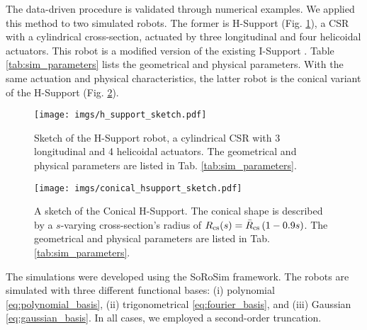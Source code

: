 The data-driven procedure is validated through numerical examples. We applied this method to two simulated robots.
The former is H-Support (Fig. \ref{fig:h_support}), a \ac{CSR} with a cylindrical cross-section, actuated by three longitudinal and four helicoidal actuators. This robot is a modified version of the existing I-Support \cite{manti2016soft}.
Table \ref{tab:sim_parameters} lists the geometrical and physical parameters.
With the same actuation and physical characteristics, the latter robot is the conical variant of the H-Support (Fig. \ref{fig:conical_hsupport_sketch}).
%     
\begin{figure}
    \centering
    \texttt{[image: imgs/h\_support\_sketch.pdf]}
    \caption{Sketch of the H-Support robot, a cylindrical \ac{CSR} with 3 longitudinal and 4 helicoidal actuators. The geometrical and physical parameters are listed in Tab. \ref{tab:sim_parameters}.}
    \label{fig:h_support}
\end{figure}
%     
\begin{figure}
    \centering
    \texttt{[image: imgs/conical\_hsupport\_sketch.pdf]}
    \caption{A sketch of the Conical H-Support. The conical shape is described by a $s$-varying cross-section's radius of $R_{\textnormal{cs}}(s) = \bar{R}_{\textnormal{cs}} \left(1 -0.9 s\right)$. The geometrical and physical parameters are listed in Tab. \ref{tab:sim_parameters}.}
    \label{fig:conical_hsupport_sketch}
\end{figure}

The simulations were developed using the \ac{SoRoSim} \cite{mathew2022sorosim} framework.
The robots are simulated with three different functional bases: (i) polynomial \eqref{eq:polynomial_basis}, (ii) trigonometrical \eqref{eq:fourier_basis}, and (iii) Gaussian \eqref{eq:gaussian_basis}. In all cases, we employed a second-order truncation.

